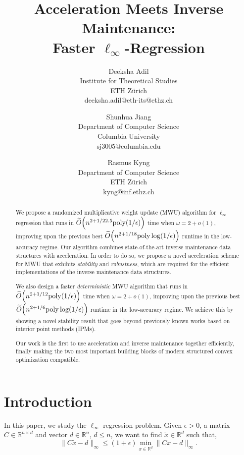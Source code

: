 \documentclass[11pt]{article}
\title{
Acceleration Meets Inverse Maintenance: \\
Faster $\ell_{\infty}$-Regression}
\author{Deeksha Adil\\Institute for Theoretical Studies\\
ETH Zürich\\deeksha.adil@eth-its@ethz.ch \and Shunhua Jiang\\
Department of Computer Science\\
Columbia University\\ sj3005@columbia.edu \and Rasmus Kyng\\Department of Computer Science\\ETH Zürich\\kyng@inf.ethz.ch}
\date{}
\let\originalleft\left
\let\originalright\right
\renewcommand{\left}{\mathopen{}\mathclose\bgroup\originalleft}
\renewcommand{\right}{\aftergroup\egroup\originalright}
\newcommand\dd{\boldsymbol{\mathit{d}}}
\newcommand\xx{\boldsymbol{\mathit{x}}}
\newcommand\xxtil{\widetilde{\boldsymbol{\mathit{x}}}}
\newcommand\CC{\boldsymbol{\mathit{C}}}
\begin{document}
\maketitle
\begin{abstract}
We propose a randomized multiplicative weight update (MWU) algorithm for $\ell_{\infty}$ regression that runs in $\widetilde{O}\left(n^{2+1/22.5} \mathrm{poly}(1/\epsilon)\right)$ time when $\omega = 2+o(1)$, improving upon the previous best $\widetilde{O}\left(n^{2+1/18} \mathrm{poly}\log(1/\epsilon)\right)$ runtime in the low-accuracy regime. Our algorithm combines state-of-the-art inverse maintenance data structures with acceleration. In order to do so, we propose a novel acceleration scheme for MWU that exhibits \textit{stability} and \textit{robustness}, which are required for the efficient implementations of the inverse maintenance data structures.

We also design a faster \textit{deterministic} MWU algorithm that runs in $\widetilde{O}\left(n^{2+1/12}\mathrm{poly}(1/\epsilon)\right)$ time when $\omega = 2+o(1)$, improving upon the previous best $\widetilde{O}\left(n^{2+1/6} \mathrm{poly} \log(1/\epsilon)\right)$ runtime in the low-accuracy regime. We achieve this by showing a novel stability result that goes beyond previously known works based on interior point methods (IPMs).

Our work is the first to use acceleration and inverse maintenance together efficiently, finally making the two most important building blocks of modern structured convex optimization compatible.
\end{abstract}
\newpage
\tableofcontents



\newpage
\section{Introduction}

In this paper, we study the $\ell_{\infty}$-regression problem. Given $\epsilon>0$, a matrix $\CC\in \mathbb{R}^{n\times d}$ and vector $\dd\in \mathbb{R}^{n}$, $d\leq n$, we want to find $\xxtil \in \mathbb{R}^d$ such that,
\begin{equation}\label{eq:Prob}
  \|\CC\xxtil -\dd\|_{\infty}
     \leq (1+\epsilon) \min_{\xx\in \mathbb{R}^d} \|\CC\xx-\dd\|_{\infty}.
\end{equation}
\end{document}

